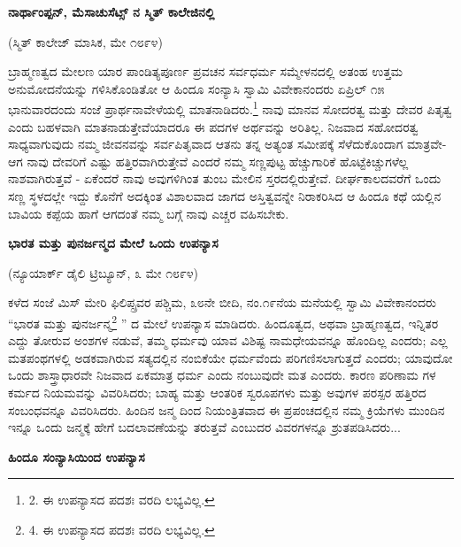 \begin{center}
\textbf{ನಾರ್ಥಾಂಪ್ಪನ್, ಮೆಸಾಚುಸೆಟ್ಸ್ ನ ಸ್ಮಿತ್ ಕಾಲೇಜಿನಲ್ಲಿ}
\end{center}

\begin{center}
(ಸ್ಮಿತ್ ಕಾಲೇಜ್ ಮಾಸಿಕ, ಮೇ ೧೮೯೪)
\end{center}

ಬ್ರಾಹ್ಮಣತ್ವದ ಮೇಲಣ ಯಾರ ಪಾಂಡಿತ್ಯಪೂರ್ಣ ಪ್ರವಚನ ಸರ್ವಧರ್ಮ ಸಮ್ಮೇಳನದಲ್ಲಿ ಅತಂಹ ಉತ್ತಮ ಅನುಮೋದನೆಯನ್ನು ಗಳಿಸಿಕೊಂಡಿತೋ ಆ ಹಿಂದೂ ಸಂನ್ಯಾಸಿ ಸ್ವಾಮಿ ವಿವೇಕಾನಂದರು ಏಪ್ರಿಲ್ ೧೫ ಭಾನುವಾರದಂದು ಸಂಜೆ ಪ್ರಾರ್ಥನಾವೇಳೆಯಲ್ಲಿ ಮಾತನಾಡಿದರು.\footnote{2. ಈ ಉಪನ್ಯಾಸದ ಪದಶಃ ವರದಿ ಲಭ್ಯವಿಲ್ಲ.} ನಾವು ಮಾನವ ಸೋದರತ್ವ ಮತ್ತು ದೇವರ ಪಿತೃತ್ವ ಎಂದು ಬಹಳವಾಗಿ ಮಾತನಾಡುತ್ತೇವೆಯಾದರೂ ಈ ಪದಗಳ ಅರ್ಥವನ್ನು ಅರಿತಿಲ್ಲ. ನಿಜವಾದ ಸಹೋದರತ್ವ ಸಾಧ್ಯವಾಗುವುದು ನಮ್ಮ ಜೀವನವನ್ನು ಸರ್ವಪಿತೃವಾದ ಆತನು ತನ್ನ ಅತ್ಯಂತ ಸಮೀಪಕ್ಕೆ ಸೆಳೆದುಕೊಂದಾಗ ಮಾತ್ರವೇ- ಆಗ ನಾವು ದೇವರಿಗೆ ಎಷ್ಟು ಹತ್ತಿರವಾಗಿರುತ್ತೇವೆ ಎಂದರೆ ನಮ್ಮ ಸಣ್ಣಪುಟ್ಟ ಹೆಚ್ಚುಗಾರಿಕೆ ಹೊಟ್ಟೆಕಿಚ್ಚುಗಳೆಲ್ಲ ನಾಶವಾಗಿರುತ್ತವೆ - ಏಕೆಂದರೆ ನಾವು ಅವುಗಳಿಗಿಂತ ತುಂಬ ಮೇಲಿನ ಸ್ತರದಲ್ಲಿರುತ್ತೇವೆ. ದೀರ್ಘಕಾಲದವರೆಗೆ ಒಂದು ಸಣ್ಣ ಸ್ಥಳದಲ್ಲೇ ಇದ್ದು ಕೊನೆಗೆ ಅದಕ್ಕಿಂತ ವಿಶಾಲವಾದ ಜಾಗದ ಅಸ್ತಿತ್ವವನ್ನೇ ನಿರಾಕರಿಸಿದ ಆ ಹಿಂದೂ ಕಥೆ ಯಲ್ಲಿನ ಬಾವಿಯ ಕಪ್ಪೆಯ ಹಾಗೆ ಆಗದಂತೆ ನಮ್ಮ ಬಗ್ಗೆ ನಾವು ಎಚ್ಚರ ವಹಿಸಬೇಕು.

\begin{center}
\textbf{ಭಾರತ ಮತ್ತು ಪುನರ್ಜನ್ಮದ ಮೇಲೆ ಒಂದು ಉಪನ್ಯಾಸ}
\end{center}

\begin{center}
(ನ್ಯೂಯಾರ್ಕ್ ಡೈಲಿ ಟ್ರಿಬ್ಯೂನ್, ೩ ಮೇ ೧೮೯೪)
\end{center}

ಕಳೆದ ಸಂಜೆ ಮಿಸ್ ಮೇರಿ ಫಿಲಿಪ್ಸ್ರವರ ಪಶ್ಚಿಮ, ೩೮ನೇ ಬೀದಿ, ನಂ.೧೯ನೆಯ ಮನೆಯಲ್ಲಿ ಸ್ವಾಮಿ ವಿವೇಕಾನಂದರು  “ಭಾರತ ಮತ್ತು ಪುನರ್ಜನ್ಮ\footnote{4. ಈ ಉಪನ್ಯಾಸದ ಪದಶಃ ವರದಿ ಲಭ್ಯವಿಲ್ಲ.} ” ದ ಮೇಲೆ ಉಪನ್ಯಾಸ ಮಾಡಿದರು. ಹಿಂದೂತ್ವದ, ಅಥವಾ ಬ್ರಾಹ್ಮಣತ್ವದ, ಇನ್ನಿತರ ಎದ್ದು ತೋರುವ ಅಂಶಗಳ ನಡುವೆ, ತಮ್ಮ ಧರ್ಮವು ಯಾವ ವಿಶಿಷ್ಟ ನಾಮಧೇಯವನ್ನೂ ಹೊಂದಿಲ್ಲ ಎಂದರು; ಎಲ್ಲ ಮತಪಂಥಗಳಲ್ಲಿ ಅಡಕವಾಗಿರುವ ಸತ್ಯದಲ್ಲಿನ ನಂಬಿಕೆಯೇ ಧರ್ಮವೆಂದು ಪರಿಗಣಿಸಲಾಗುತ್ತದೆ ಎಂದರು; ಯಾವುದೋ ಒಂದು ಶಾಸ್ತ್ರಾಧಾರವೇ ನಿಜವಾದ ಏಕಮಾತ್ರ ಧರ್ಮ ಎಂದು ನಂಬುವುದೇ ಮತ ಎಂದರು. ಕಾರಣ ಪರಿಣಾಮ ಗಳ ಕರ್ಮದ ನಿಯಮವನ್ನು ವಿವರಿಸಿದರು; ಬಾಹ್ಯ ಮತ್ತು ಆಂತರಿಕ ಸ್ವರೂಪಗಳು ಮತ್ತು ಅವುಗಳ ಪರಸ್ಪರ ಹತ್ತಿರದ ಸಂಬಂಧವನ್ನೂ ವಿವರಿಸಿದರು. ಹಿಂದಿನ ಜನ್ಮ ದಿಂದ ನಿಯಂತ್ರಿತವಾದ ಈ ಪ್ರಪಂಚದಲ್ಲಿನ ನಮ್ಮ ಕ್ರಿಯೆಗಳು ಮುಂದಿನ ಇನ್ನೂ ಒಂದು ಜನ್ಮಕ್ಕೆ ಹೇಗೆ ಬದಲಾವಣೆಯನ್ನು ತರುತ್ತವೆ ಎಂಬುದರ ವಿವರಗಳನ್ನೂ ಶ್ರುತಪಡಿಸಿದರು...

\begin{center}
\textbf{ಹಿಂದೂ ಸಂನ್ಯಾಸಿಯಿಂದ ಉಪನ್ಯಾಸ}
\end{center}

